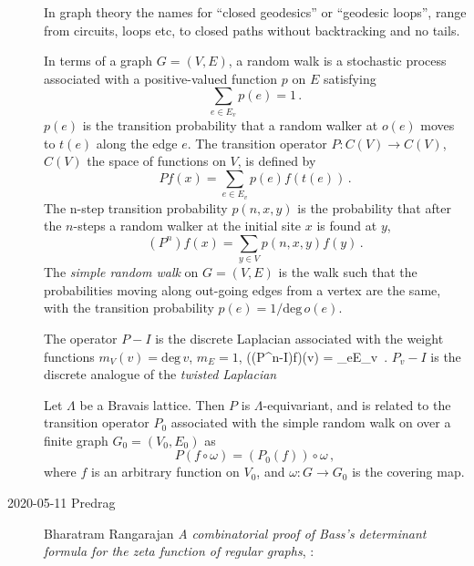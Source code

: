 \begin{description}
In graph theory the names for ``closed geodesics'' or ``geodesic loops'',
range from circuits, loops etc, to closed paths without backtracking and
no tails.

In terms of a graph $G = (V,E)$, a random walk is a stochastic process
associated with a positive-valued function $p$ on $E$ satisfying
\[
\sum_{e\in E_v}
p(e) = 1
\,.
\]
$p(e)$ is the transition probability that a random walker
at $o(e)$ moves to $t(e)$ along the edge $e$.
The transition operator $P : C(V) \to C(V)$,
$C(V)$ the space of functions on $V$, is defined by
\[
Pf(x) = \sum_{e\in E_v} p(e) f(t(e))
\,.
\]
The n-step transition probability $p(n,x,y)$ is the probability that
after the $n$-steps a random walker at the initial site $x$ is found at
$y$,
\[
\left(P^n\right)f(x) = \sum_{y\in V} p(n,x,y) f(y)
\,.
\]
The \emph{simple random walk} on $G=(V,E)$  is the walk such that the
probabilities moving along out-going edges from a vertex are the same,
with the transition probability $p(e)=1/\mbox{deg}\,o(e)$.

The operator $P-I$ is the discrete Laplacian associated
with the weight functions $m_V(v) = \mbox{deg}\,v$, $m_E=1$,
\beq
\left((P^n-I)f\right)(v) = \sum_{e\in E_v}
        \left[f(t(e))-f(o(e))\right]
\,.
$P_v-I$ is the discrete analogue of the \emph{twisted
Laplacian}

Let $\Lambda$ be a Bravais lattice. Then $P$ is $\Lambda$-equivariant,
and is related to the transition operator $P_0$ associated with the
simple random walk on over a finite graph $G_0=(V_0,E_0)$ as
\[
P( f \circ \omega) = \left(P_0( f )\right) \circ \omega
\,,
\]
where $f$ is an arbitrary function on $V_0$, and
$\omega : G \to G_0$ is the covering map.

\item[2020-05-11 Predrag]
Bharatram Rangarajan
{\em A combinatorial proof of Bass's determinant formula for the zeta
function of regular graphs}, :


\end{description}
